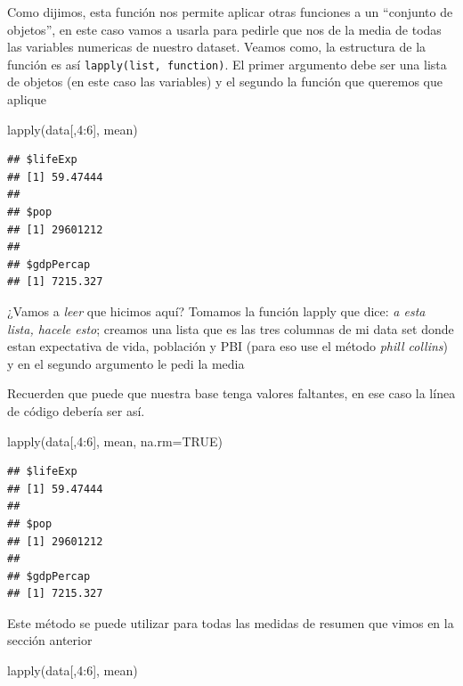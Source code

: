 \documentclass[
]{book}
\newenvironment{Shaded}{\begin{snugshade}}{\end{snugshade}}
\newcommand{\AttributeTok}[1]{\textcolor[rgb]{0.77,0.63,0.00}{#1}}
\newcommand{\ConstantTok}[1]{\textcolor[rgb]{0.00,0.00,0.00}{#1}}
\newcommand{\DecValTok}[1]{\textcolor[rgb]{0.00,0.00,0.81}{#1}}
\newcommand{\FunctionTok}[1]{\textcolor[rgb]{0.00,0.00,0.00}{#1}}
\newcommand{\NormalTok}[1]{#1}
\newcommand{\SpecialCharTok}[1]{\textcolor[rgb]{0.00,0.00,0.00}{#1}}
\begin{document}
Como dijimos, esta función nos permite aplicar otras funciones a un ``conjunto de objetos'', en este caso vamos a usarla para pedirle que nos de la media de todas las variables numericas de nuestro dataset. Veamos como, la estructura de la función es así \texttt{lapply(list,\ function)}. El primer argumento debe ser una lista de objetos (en este caso las variables) y el segundo la función que queremos que aplique

\begin{Shaded}
\begin{Highlighting}[]
\FunctionTok{lapply}\NormalTok{(data[,}\DecValTok{4}\SpecialCharTok{:}\DecValTok{6}\NormalTok{], mean)}
\end{Highlighting}
\end{Shaded}

\begin{verbatim}
## $lifeExp
## [1] 59.47444
## 
## $pop
## [1] 29601212
## 
## $gdpPercap
## [1] 7215.327
\end{verbatim}

¿Vamos a \emph{leer} que hicimos aquí? Tomamos la función lapply que dice: \emph{a esta lista, hacele esto}; creamos una lista que es las tres columnas de mi data set donde estan expectativa de vida, población y PBI (para eso use el método \emph{phill collins}) y en el segundo argumento le pedi la media

Recuerden que puede que nuestra base tenga valores faltantes, en ese caso la línea de código debería ser así.

\begin{Shaded}
\begin{Highlighting}[]
\FunctionTok{lapply}\NormalTok{(data[,}\DecValTok{4}\SpecialCharTok{:}\DecValTok{6}\NormalTok{], mean, }\AttributeTok{na.rm=}\ConstantTok{TRUE}\NormalTok{)}
\end{Highlighting}
\end{Shaded}

\begin{verbatim}
## $lifeExp
## [1] 59.47444
## 
## $pop
## [1] 29601212
## 
## $gdpPercap
## [1] 7215.327
\end{verbatim}

Este método se puede utilizar para todas las medidas de resumen que vimos en la sección anterior

\begin{Shaded}
\begin{Highlighting}[]
\FunctionTok{lapply}\NormalTok{(data[,}\DecValTok{4}\SpecialCharTok{:}\DecValTok{6}\NormalTok{], mean)}
\end{Highlighting}
\end{Shaded}
\end{document}
